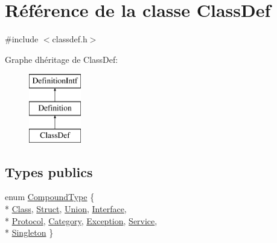 \hypertarget{class_class_def}{}\section{Référence de la classe Class\+Def}
\label{class_class_def}


{\ttfamily \#include $<$classdef.\+h$>$}

Graphe d\textquotesingle{}héritage de Class\+Def\+:\begin{figure}[H]
\begin{center}
\leavevmode
\includegraphics[height=3.000000cm]{class_class_def}
\end{center}
\end{figure}
\subsection*{Types publics}
\begin{DoxyCompactItemize}
\item 
enum \hyperlink{class_class_def_ae70cf86d35fe954a94c566fbcfc87939}{Compound\+Type} \{ \\*
\hyperlink{class_class_def_ae70cf86d35fe954a94c566fbcfc87939a5261cde79065c9b6af97195e43e8073b}{Class}, 
\hyperlink{class_class_def_ae70cf86d35fe954a94c566fbcfc87939adbed80de6b389027e03afb5abb06f2c9}{Struct}, 
\hyperlink{class_class_def_ae70cf86d35fe954a94c566fbcfc87939a07fb8df6b10c0140665c0421b6f64c09}{Union}, 
\hyperlink{class_class_def_ae70cf86d35fe954a94c566fbcfc87939a6ff6e3b1bbf7e59a752826880e148528}{Interface}, 
\\*
\hyperlink{class_class_def_ae70cf86d35fe954a94c566fbcfc87939a16feb88dead0850cea552a51ad9d26b5}{Protocol}, 
\hyperlink{class_class_def_ae70cf86d35fe954a94c566fbcfc87939a937d0378cd8fb4b49efe215cc6c00469}{Category}, 
\hyperlink{class_class_def_ae70cf86d35fe954a94c566fbcfc87939ad14369c9a6f5e3977c0e02714a4beba8}{Exception}, 
\hyperlink{class_class_def_ae70cf86d35fe954a94c566fbcfc87939aaf2c9d4d2eaa6e6a614d7bd164a29c0e}{Service}, 
\\*
\hyperlink{class_class_def_ae70cf86d35fe954a94c566fbcfc87939a34f6a5dd42307d62a5fe3038b245a667}{Singleton}
 \}
\end{DoxyCompactItemize}
